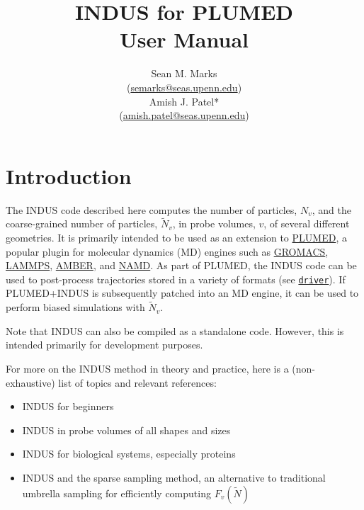 \documentclass[11pt,notitlepage]{article}
\newcommand{\email}[1]{\href{mailto:{#1}}{{#1}}}
\newcommand{\PLUMED}{\href{http://www.plumed.org/}{PLUMED}}
\newcommand{\plumeddoc}{https://plumed.github.io/doc-v2.4/user-doc/html}
\newcommand{\driver}{\href{\plumeddoc/driver.html}{\texttt{driver}}}
\newcommand{\GROMACS}{\href{http://www.gromacs.org/}{GROMACS}}
\newcommand{\LAMMPS}{\href{https://lammps.sandia.gov/}{LAMMPS}}
\newcommand{\AMBER}{\href{http://ambermd.org/}{AMBER}}
\newcommand{\NAMD}{\href{https://www.ks.uiuc.edu/Research/namd/}{NAMD}}
\begin{document}
	
\renewcommand\Affilfont{\itshape\small}
	
\title{INDUS for PLUMED\\User Manual}
\author{Sean M. Marks\\(\email{semarks@seas.upenn.edu})\\Amish J. Patel*\\(\email{amish.patel@seas.upenn.edu})}
	

\maketitle
\tableofcontents


\section{Introduction}

The INDUS code described here computes the number of particles, $N_v$, and the coarse-grained number of particles, $\tilde{N}_v$, in probe volumes, $v$, of several different geometries. It is primarily intended to be used as an extension to \PLUMED, a popular plugin for molecular dynamics (MD) engines such as \GROMACS, \LAMMPS, \AMBER, and \NAMD. As part of PLUMED, the INDUS code can be used to post-process trajectories stored in a variety of formats (see \driver). If PLUMED+INDUS is subsequently patched into an MD engine, it can be used to perform biased simulations with $\tilde{N}_v$.

Note that INDUS can also be compiled as a standalone code. However, this is intended primarily for development purposes.

For more on the INDUS method in theory and practice, here is a (non-exhaustive) list of topics and relevant references:
\begin{itemize}
	\item INDUS for beginners \cite{Patel2010}
	\item INDUS in probe volumes of all shapes and sizes \cite{Patel2011}
	\item INDUS for biological systems, especially proteins \cite{Patel2012,Patel2014}
	\item INDUS and the sparse sampling method, an alternative to traditional umbrella sampling for efficiently computing $F_v(\tilde{N})$ \cite{Xi2016,Xi2018}
\end{itemize}
\end{document}
